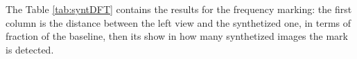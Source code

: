 The Table \ref{tab:syntDFT} contains the results for the frequency marking: the first column is the distance between the left view and the synthetized one, in terms of fraction of the baseline, then its show in how many synthetized images the mark is detected.

\begin{table}[htbp]

 \begin{center}
 \caption{Detection in the syntetized views \label{tab:syntDFT}}
 \end{center}
 \end{table}
 
